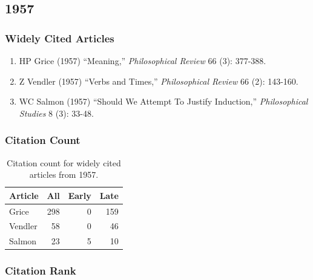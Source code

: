 \documentclass[
  10pt,
  letterpaper,
  DIV=11,
  numbers=noendperiod,
  twoside]{scrartcl}
\providecommand{\tightlist}{%
  \setlength{\itemsep}{0pt}\setlength{\parskip}{0pt}}\usepackage{longtable,booktabs,array}
\begin{document}
\newpage

\subsection{1957}\label{sec-s1957}

\subsubsection*{Widely Cited Articles}\label{widely-cited-articles-1}

\begin{enumerate}
\def\labelenumi{\arabic{enumi}.}
\tightlist
\item
  HP Grice (1957) ``Meaning,'' \emph{Philosophical Review} 66 (3):
  377-388.
\item
  Z Vendler (1957) ``Verbs and Times,'' \emph{Philosophical Review} 66
  (2): 143-160.
\item
  WC Salmon (1957) ``Should We Attempt To Justify Induction,''
  \emph{Philosophical Studies} 8 (3): 33-48.
\end{enumerate}

\subsubsection*{Citation Count}\label{sec-count-1957}

\begin{longtable}[]{@{}lrrr@{}}

\caption{\label{tbl-citation-count-1957}Citation count for widely cited
articles from 1957.}

\tabularnewline

\toprule\noalign{}
Article & All & Early & Late \\
\midrule\noalign{}
\endhead
\bottomrule\noalign{}
\endlastfoot
Grice & 298 & 0 & 159 \\
Vendler & 58 & 0 & 46 \\
Salmon & 23 & 5 & 10 \\

\end{longtable}

\subsubsection*{Citation Rank}\label{sec-rank-1957}
\end{document}
